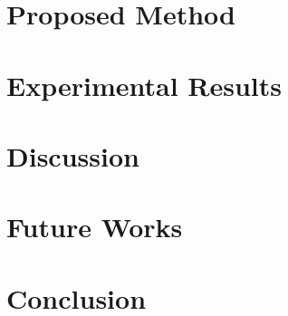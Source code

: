 \documentclass[10pt,twocolumn,letterpaper]{article}
\begin{document}
\section{Proposed Method}


\section{Experimental Results}


\section{Discussion}\label{discussion}



\section{Future Works}


\section{Conclusion}



{\small


}
\end{document}
